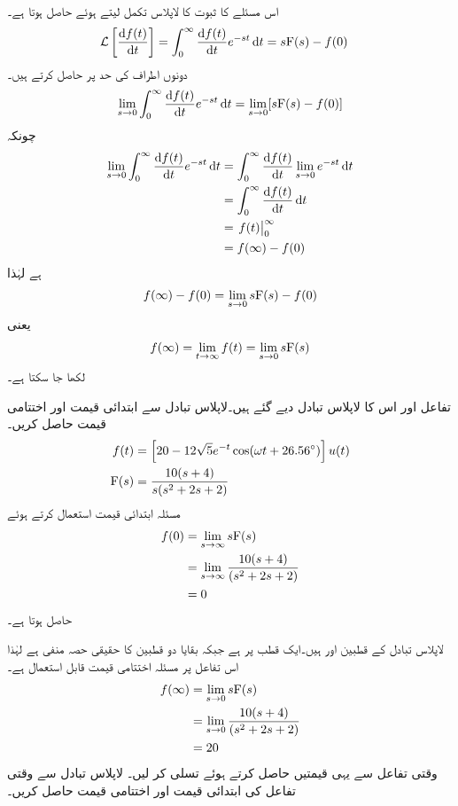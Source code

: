 اس مسئلے کا ثبوت  کا لاپلاس تکمل لیتے ہوئے حاصل ہوتا ہے۔
\begin{align*}
\Laplace\left[\frac{\dif f(t)}{\dif t}\right]&=\int_0^{\infty} \frac{\dif f(t)}{\dif t} e^{-st} \dif t=s\bF(s)-f(0)
\end{align*}
دونوں اطراف کی حد  پر حاصل کرتے ہیں۔
\begin{align*}
\lim_{s \to 0}\int_0^{\infty} \frac{\dif f(t)}{\dif t} e^{-st} \dif t=\lim_{s \to 0}[s\bF(s)-f(0)]
\end{align*}
چونکہ
\begin{align*}
\lim_{s \to 0}\int_0^{\infty} \frac{\dif f(t)}{\dif t} e^{-st} \dif t&=\int_0^{\infty} \frac{\dif f(t)}{\dif t} \lim_{s \to 0}e^{-st} \dif t\\
&=\int_0^{\infty} \frac{\dif f(t)}{\dif t} \dif t\\
&=\left. f(t) \right|_{0}^{\infty}\\
&=f(\infty)-f(0)
\end{align*}
ہے لہٰذا
\begin{align*}
f(\infty)-f(0)=\lim_{s \to 0} s{{\textup{F}}}(s)-f(0)
\end{align*}
یعنی
\begin{align*}
f(\infty)=\lim_{t \to \infty}f(t)=\lim_{s \to 0} s{{\textup{F}}}(s)
\end{align*}
لکھا جا سکتا ہے۔

تفاعل اور اس کا لاپلاس تبادل دیے گئے ہیں۔لاپلاس تبادل سے ابتدائی قیمت  اور اختتامی قیمت  حاصل کریں۔
\begin{align*}
f(t)&=\left[20-12\sqrt{5} e^{-t} \cos(\omega t+26.56^{\circ})\right]u(t)\\
{{\textup{F}}}(s)&=\frac{10(s+4)}{s(s^2+2s+2)}
\end{align*}
مسئلہ ابتدائی قیمت استعمال کرتے ہوئے
\begin{align*}
f(0)&=\lim_{s \to \infty} s{{\textup{F}}}(s)\\
&=\lim_{s \to \infty} \frac{10(s+4)}{(s^2+2s+2)}\\
&=0
\end{align*}
حاصل ہوتا ہے۔

لاپلاس تبادل کے قطبین  اور   ہیں۔ایک قطب  پر ہے جبکہ بقایا دو قطبین کا حقیقی حصہ منفی ہے لہٰذا اس تفاعل پر مسئلہ اختتامی قیمت قابل استعمال ہے۔
\begin{align*}
f(\infty)&=\lim_{s \to 0} s{{\textup{F}}}(s)\\
&=\lim_{s \to 0} \frac{10(s+4)}{(s^2+2s+2)}\\
&=20
\end{align*}
وقتی تفاعل  سے یہی قیمتیں حاصل کرتے ہوئے تسلی کر لیں۔
لاپلاس تبادل  سے وقتی تفاعل  کی ابتدائی قیمت اور اختتامی قیمت حاصل کریں۔

